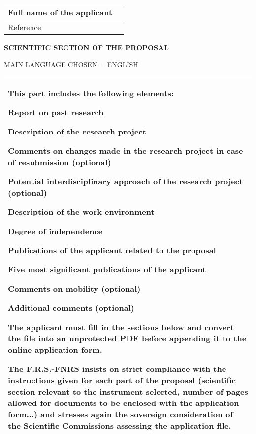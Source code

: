 \documentclass[12pt,a4paper]{article}
\begin{document}
\large
\fontsize{13.3pt}{.77\baselineskip}\selectfont
{\centering\begin{small}
\fontsize{10.7pt}{.85\baselineskip}\selectfont%
{\renewcommand{\arraystretch}{1.2}
\vspace*{-3.5mm}
\begin{tabular}{@{}|p{}|p{}|@{}}
\hline Full name of the applicant &
	\\
\hline Reference &
	\\
\hline
\end{tabular}
}\vspace{.5cm}

\MakeUppercase{\bfseries\Large Scientific section of the proposal}
\par\MakeUppercase{\small Main language chosen = English}
\vspace{4mm}

\hfil\begin{tabular}{|p{10.75cm}|}
\hline
\vspace{1sp}
This part includes the following elements:
\begin{list}{\arabic{enumi}.}{
	\usecounter{enumi}
	\itemsep 0pt \parsep 0pt \parskip 0pt
	\settowidth{\labelwidth}{10.}
	\setlength{\leftmargin}{1.3cm}
}
\item Report on past research
\item Description of the research project
\item Comments on changes made in the research project in case of resubmission (optional)
\item Potential interdisciplinary approach of the research project (optional)
\item Description of the work environment
\item Degree of independence
\item Publications of the applicant related to the proposal
\item Five most significant publications of the applicant
\item Comments on mobility (optional)
\item Additional comments (optional)
\end{list}

\vspace{2mm}
\textbf{\color[RGB]{31,73,125}The applicant must fill in the sections below and convert the file into an unprotected PDF before appending it to the online application form.}

\vspace{4mm}
The F.R.S.-FNRS insists on \textbf{strict compliance with the instructions given for each part of the proposal} (scientific section relevant to the instrument selected, number of pages allowed for documents to be enclosed with the application form...) and stresses again the sovereign consideration of the Scientific Commissions assessing the application file.
\\[1.5mm]\hline
\end{tabular}
\end{small}
}
\end{document}
